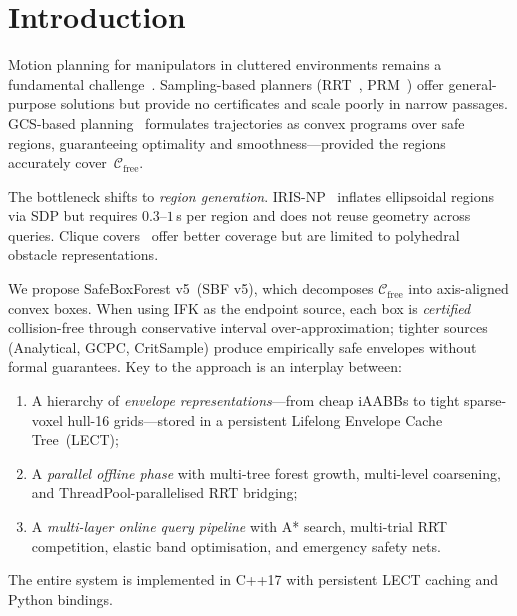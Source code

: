 \documentclass[journal]{IEEEtran}
\newcommand{\Cfree}{\mathcal{C}_\text{free}}
\begin{document}
\section{Introduction}\label{sec:intro}

Motion planning for manipulators in cluttered environments
remains a fundamental challenge~\cite{lavalle2006planning}.
Sampling-based planners (RRT~\cite{lavalle1998rapidly},
PRM~\cite{kavraki1996probabilistic}) offer general-purpose
solutions but provide no certificates and scale poorly in
narrow passages.
GCS-based planning~\cite{marcucci2024motion} formulates trajectories
as convex programs over safe regions, guaranteeing optimality and
smoothness---provided the regions accurately cover~$\Cfree$.

The bottleneck shifts to \emph{region generation}.
IRIS-NP~\cite{werner2024fast} inflates ellipsoidal regions via SDP
but requires $0.3$--$1$\,s per region and does not reuse geometry
across queries.
Clique covers~\cite{amice2024clique} offer better coverage but are
limited to polyhedral obstacle representations.

We propose SafeBoxForest v5~(SBF v5), which decomposes $\Cfree$
into axis-aligned convex boxes.
When using IFK as the endpoint source, each box is \emph{certified}
collision-free through conservative interval over-approximation;
tighter sources (Analytical, GCPC, CritSample) produce empirically
safe envelopes without formal guarantees.
Key to the approach is an interplay between:
\begin{enumerate}[nosep]
  \item A hierarchy of \emph{envelope representations}---from cheap
    iAABBs to tight sparse-voxel hull-16 grids---stored in a
    persistent Lifelong Envelope Cache Tree~(LECT);
  \item A \emph{parallel offline phase} with multi-tree forest
    growth, multi-level coarsening, and ThreadPool-parallelised
    RRT bridging;
  \item A \emph{multi-layer online query pipeline} with A* search,
    multi-trial RRT competition, elastic band optimisation, and
    emergency safety nets.
\end{enumerate}

The entire system is implemented in C++17 with persistent LECT
caching and Python bindings.
\end{document}
